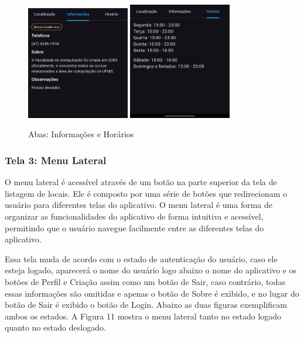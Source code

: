     \begin{figure}
        \centering
        \includegraphics[width=0.4\textwidth]{imagens/info.jpg}
        \hspace{10mm}
        \includegraphics[width=0.4\textwidth]{imagens/horario.jpg}
        \caption{\scriptsize Abas: Informações e Horários}
        \label{fig:tela2-abas}
    \end{figure}

    \FloatBarrier

\subsubsection{Tela 3: Menu Lateral}

    O menu lateral é acessível através de um botão na parte superior da tela de listagem de locais. Ele é composto por uma série de botões que redirecionam o usuário para diferentes telas do aplicativo. O menu lateral é uma forma de organizar as funcionalidades do aplicativo de forma intuitiva e acessível, permitindo que o usuário navegue facilmente entre as diferentes telas do aplicativo.

    Essa tela muda de acordo com o estado de autenticação do usuário, caso ele esteja logado, aparecerá o nome do usuário logo abaixo o nome do aplicativo e os botões de Perfil e Criação assim como um botão de Sair, caso contrário, todas essas informações são omitidas e apenas o botão de Sobre é exibido, e no lugar do botão de Sair é exibido o botão de Login. Abaixo as duas figuras exemplificam ambos os estados. A Figura 11 mostra o menu lateral tanto no estado logado quanto no estado deslogado.

